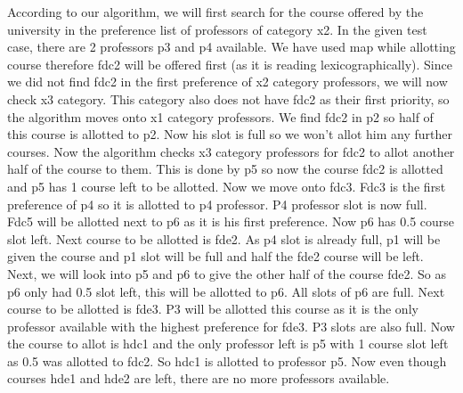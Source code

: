 \documentclass{article}
\begin{document}
According to our algorithm, we will first search for the course offered by the university in the preference list of professors of category x2. In the given test case, there are 2 professors p3 and p4 available. We have used map while allotting course therefore fdc2 will be offered first (as it is reading lexicographically). Since we did not find fdc2 in the first preference of x2 category professors, we will now check x3 category. This category also does not have fdc2 as their first priority, so the algorithm moves onto x1 category professors. We find fdc2 in p2 so half of this course is allotted to p2. Now his slot is full so we won’t allot him any further courses. Now the algorithm checks x3 category professors for fdc2 to allot another half of the course to them. This is done by p5 so now the course fdc2 is allotted and p5 has 1 course left to be allotted. Now we move onto fdc3. Fdc3 is the first preference of p4 so it is allotted to p4 professor. P4 professor slot is now full. Fdc5 will be allotted next to p6 as it is his first preference. Now p6 has 0.5 course slot left.  Next course to be allotted is fde2. As p4 slot is already full, p1 will be given the course and p1 slot will be full and half the fde2 course will be left. Next, we will look into p5 and p6 to give the other half of the course fde2. So as p6 only had 0.5 slot left, this will be allotted to p6. All slots of p6 are full. Next course to be allotted is fde3. P3 will be allotted this course as it is the only professor available with the highest preference for fde3. P3 slots are also full. Now the course to allot is hdc1 and the only professor left is p5 with 1 course slot left as 0.5 was allotted to fdc2. So hdc1 is allotted to professor p5. Now even though courses hde1 and hde2 are left, there are no more professors available.
\end{document}
